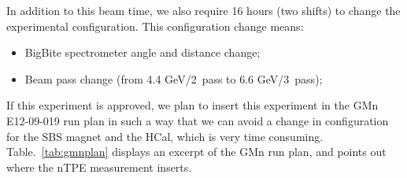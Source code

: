 In addition to this beam time, we also require 16 hours (two shifts) to change the experimental configuration.
This configuration change means:
%
\begin{itemize}
\item{BigBite spectrometer angle and distance change;}
\item{Beam pass change (from 4.4 GeV/2~pass to 6.6 GeV/3~pass);}
\end{itemize}
%
If this experiment is approved, we plan to insert this experiment in the GMn E12-09-019 run plan in such a way that we can avoid a change in configuration for the SBS magnet and the HCal, which is very time consuming. Table.~\ref{tab:gmnplan} displays an excerpt of the GMn run plan, and points out where the nTPE measurement inserts. 
%
